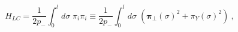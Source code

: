 \begin{equation}
\label{eq:LC zeroAdS Hamiltonian}
    H_{LC} = \frac{1}{2 p_-}\int_0^l d\sigma \;
    \pi_i \pi_i   \equiv
    \frac{1}{2 p_-}\int_0^l d\sigma \;
    \left( \bm{\pi}_{\perp}(\sigma)^2 +
    \pi_Y(\sigma)^2\right) \ ,
\end{equation}

